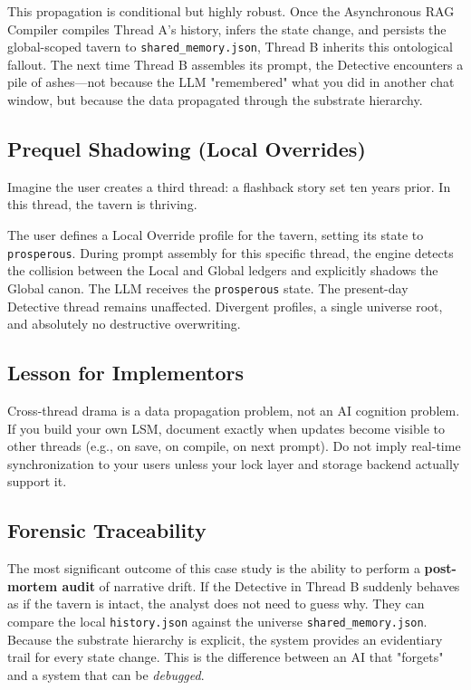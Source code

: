 \documentclass[12pt, a4paper]{article}
\begin{document}
This propagation is conditional but highly robust. Once the Asynchronous RAG Compiler compiles Thread A's history, infers the state change, and persists the global-scoped tavern to \texttt{shared\_memory.json}, Thread B inherits this ontological fallout. The next time Thread B assembles its prompt, the Detective encounters a pile of ashes---not because the LLM "remembered" what you did in another chat window, but because the data propagated through the substrate hierarchy.

\newpage
\subsection{Prequel Shadowing (Local Overrides)}
Imagine the user creates a third thread: a flashback story set ten years prior. In this thread, the tavern is thriving. 

The user defines a Local Override profile for the tavern, setting its state to \texttt{prosperous}. During prompt assembly for this specific thread, the engine detects the collision between the Local and Global ledgers and explicitly shadows the Global canon. The LLM receives the \texttt{prosperous} state. The present-day Detective thread remains unaffected. Divergent profiles, a single universe root, and absolutely no destructive overwriting.

\subsection{Lesson for Implementors}
Cross-thread drama is a data propagation problem, not an AI cognition problem. If you build your own LSM, document exactly when updates become visible to other threads (e.g., on save, on compile, on next prompt). Do not imply real-time synchronization to your users unless your lock layer and storage backend actually support it.

\subsection{Forensic Traceability}
The most significant outcome of this case study is the ability to perform a \textbf{post-mortem audit} of narrative drift. If the Detective in Thread B suddenly behaves as if the tavern is intact, the analyst does not need to guess why. They can compare the local \texttt{history.json} against the universe \texttt{shared\_memory.json}. Because the substrate hierarchy is explicit, the system provides an evidentiary trail for every state change. This is the difference between an AI that "forgets" and a system that can be \textit{debugged}.
\end{document}
